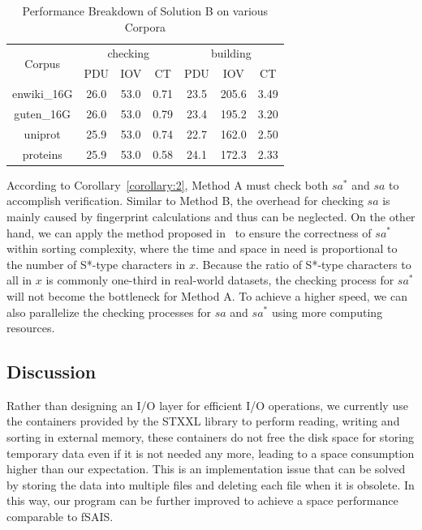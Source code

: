 \documentclass[10pt,journal,compsoc]{IEEEtran}
\begin{document}
\begin{table}%
	\caption{Performance Breakdown of Solution B on various Corpora}
	\label{tbl:breakdown_solutionb}
	\centering
	\begin{tabular}{|c|c|c|c|c|c|c|}
		\hline
		\multirow{2}{*}{Corpus} & \multicolumn{3}{|c}{checking} & \multicolumn{3}{|c|}{building} \\\cline{2-7}
		& PDU & IOV & CT & PDU & IOV & CT \\\hline
		enwiki\_16G & 26.0 & 53.0 & 0.71 & 23.5 & 205.6 & 3.49 \\\hline
		guten\_16G & 26.0 & 53.0 & 0.79 & 23.4 & 195.2 & 3.20 \\\hline
		uniprot & 25.9 & 53.0 & 0.74 & 22.7 & 162.0 & 2.50 \\\hline
		proteins & 25.9 & 53.0 & 0.58 & 24.1 & 172.3 & 2.33 \\\hline
	\end{tabular}
\end{table}%

According to Corollary~\ref{corollary:2}, Method A must check both $sa^*$ and $sa$ to accomplish verification. Similar to Method B, the overhead for checking $sa$ is mainly caused by fingerprint calculations and thus can be neglected. On the other hand, we can apply the method proposed in~\cite{wu2017} to ensure the correctness of $sa^*$ within sorting complexity, where the time and space in need is proportional to the number of S*-type characters in $x$. Because the ratio of S*-type characters to all in $x$ is commonly one-third in real-world datasets, the checking process for $sa^*$ will not become the bottleneck for Method A. To achieve a higher speed, we can also parallelize the checking processes for $sa$ and $sa^*$ using more computing resources.

\subsection{Discussion}

Rather than designing an I/O layer for efficient I/O operations, we currently use the containers provided by the STXXL library to perform reading, writing and sorting in external memory, these containers do not free the disk space for storing temporary data even if it is not needed any more, leading to a space consumption higher than our expectation. This is an implementation issue that can be solved by storing the data into multiple files and deleting each file when it is obsolete. In this way, our program can be further improved to achieve a space performance comparable to fSAIS.
\end{document}
